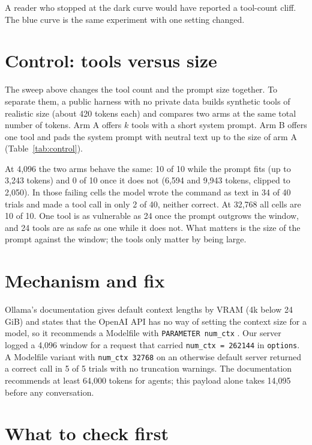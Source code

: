 \documentclass[10pt]{article}
\begin{document}
A reader who stopped at the dark curve would have reported a tool-count cliff. The blue curve is the same experiment with one setting changed.

\section{Control: tools versus size}

The sweep above changes the tool count and the prompt size together. To separate them, a public harness with no private data builds synthetic tools of realistic size (about 420 tokens each) and compares two arms at the same total number of tokens. Arm A offers $k$ tools with a short system prompt. Arm B offers one tool and pads the system prompt with neutral text up to the size of arm A (Table~\ref{tab:control}).

At 4,096 the two arms behave the same: 10 of 10 while the prompt fits (up to 3,243 tokens) and 0 of 10 once it does not (6,594 and 9,943 tokens, clipped to 2,050). In those failing cells the model wrote the command as text in 34 of 40 trials and made a tool call in only 2 of 40, neither correct. At 32,768 all cells are 10 of 10. One tool is as vulnerable as 24 once the prompt outgrows the window, and 24 tools are as safe as one while it does not. What matters is the size of the prompt against the window; the tools only matter by being large.

\controltable

\section{Mechanism and fix}

Ollama's documentation gives default context lengths by VRAM (4k below 24 GiB) and states that the OpenAI API has no way of setting the context size for a model, so it recommends a Modelfile with \texttt{PARAMETER num\_ctx} \cite{ollama-ctx,ollama-openai}. Our server logged a 4,096 window for a request that carried \texttt{num\_ctx = 262144} in \texttt{options}. A Modelfile variant with \texttt{num\_ctx 32768} on an otherwise default server returned a correct call in 5 of 5 trials with no truncation warnings. The documentation recommends at least 64,000 tokens for agents; this payload alone takes 14,095 before any conversation.

\section{What to check first}
\end{document}
